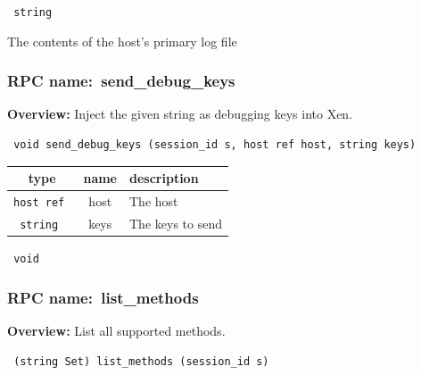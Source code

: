 \vspace{0.3cm}

{\tt 
string
}


The contents of the host's primary log file
\vspace{0.3cm}
\vspace{0.3cm}
\vspace{0.3cm}
\subsubsection{RPC name:~send\_debug\_keys}

{\bf Overview:} 
Inject the given string as debugging keys into Xen.

\begin{verbatim} void send_debug_keys (session_id s, host ref host, string keys)\end{verbatim}



 
\vspace{0.3cm}
\begin{tabular}{|c|c|p{7cm}|}
 \hline
{\bf type} & {\bf name} & {\bf description} \\ \hline
{\tt host ref } & host & The host \\ \hline 

{\tt string } & keys & The keys to send \\ \hline 

\end{tabular}

\vspace{0.3cm}

{\tt 
void
}



\vspace{0.3cm}
\vspace{0.3cm}
\vspace{0.3cm}
\subsubsection{RPC name:~list\_methods}

{\bf Overview:} 
List all supported methods.

\begin{verbatim} (string Set) list_methods (session_id s)\end{verbatim}


\vspace{0.3cm}

